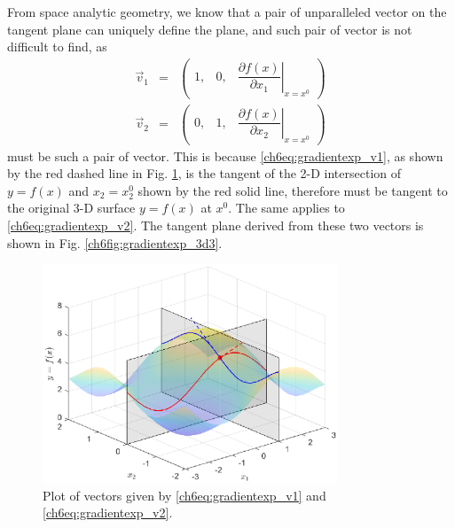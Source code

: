 From space analytic geometry, we know that a pair of unparalleled vector on the tangent plane can uniquely define the plane, and such pair of vector is not difficult to find, as
\begin{eqnarray}
 \vec{v}_1 &=& \left(\begin{array}{ccc}
                       1, & 0, & \left.\dfrac{\partial f(x)}{\partial x_1}\right|_{x=x^0}
                     \end{array}\right) \label{ch6eq:gradientexp_v1} \\
 \vec{v}_2 &=& \left(\begin{array}{ccc}
                       0, & 1, & \left.\dfrac{\partial f(x)}{\partial x_2}\right|_{x=x^0}
                     \end{array}\right) \label{ch6eq:gradientexp_v2}
\end{eqnarray}
must be such a pair of vector. This is because \eqref{ch6eq:gradientexp_v1}, as shown by the red dashed line in Fig. \ref{ch6fig:gradientexp_3d2}, is the tangent of the 2-D intersection of $y=f(x)$ and $x_2 = x_2^0$ shown by the red solid line, therefore must be tangent to the original 3-D surface $y=f(x)$ at $x^0$. The same applies to \eqref{ch6eq:gradientexp_v2}. The tangent plane derived from these two vectors is shown in Fig. \ref{ch6fig:gradientexp_3d3}.

\begin{figure}
	\centering
	\includegraphics[width=250pt]{chapters/chapter6/figures/gradientexp_3d2.eps}
	\caption{Plot of vectors given by \eqref{ch6eq:gradientexp_v1} and \eqref{ch6eq:gradientexp_v2}.} \label{ch6fig:gradientexp_3d2}
\end{figure}

